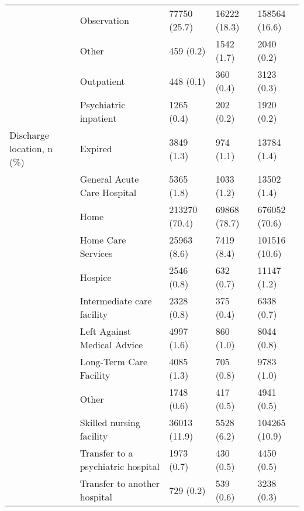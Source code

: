 \begin{tabular}{lllll}
                                       & Observation &              77750 (25.7) &       16222 (18.3) &      158564 (16.6) \\
                                       & Other &                 459 (0.2) &         1542 (1.7) &         2040 (0.2) \\
                                       & Outpatient &                 448 (0.1) &          360 (0.4) &         3123 (0.3) \\
                                       & Psychiatric inpatient &                1265 (0.4) &          202 (0.2) &         1920 (0.2) \\
Discharge location, n (\%) & Expired &                3849 (1.3) &          974 (1.1) &        13784 (1.4) \\
                                       & General Acute Care Hospital &                5365 (1.8) &         1033 (1.2) &        13502 (1.4) \\
                                       & Home &             213270 (70.4) &       69868 (78.7) &      676052 (70.6) \\
                                       & Home Care Services &               25963 (8.6) &         7419 (8.4) &      101516 (10.6) \\
                                       & Hospice &                2546 (0.8) &          632 (0.7) &        11147 (1.2) \\
                                       & Intermediate care facility &                2328 (0.8) &          375 (0.4) &         6338 (0.7) \\
                                       & Left Against Medical Advice &                4997 (1.6) &          860 (1.0) &         8044 (0.8) \\
                                       & Long-Term Care Facility &                4085 (1.3) &          705 (0.8) &         9783 (1.0) \\
                                       & Other &                1748 (0.6) &          417 (0.5) &         4941 (0.5) \\
                                       & Skilled nursing facility &              36013 (11.9) &         5528 (6.2) &      104265 (10.9) \\
                                       & Transfer to a psychiatric hospital &                1973 (0.7) &          430 (0.5) &         4450 (0.5) \\
                                       & Transfer to another hospital &                 729 (0.2) &          539 (0.6) &         3238 (0.3) \\

\end{tabular}
